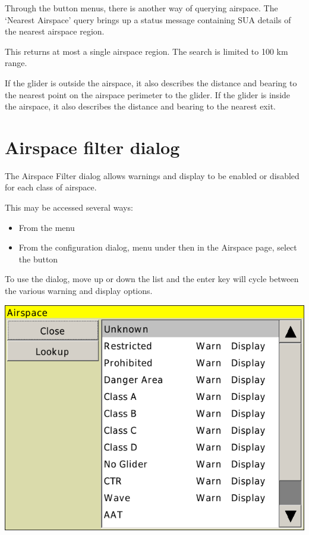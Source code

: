 \documentclass[a4paper,12pt]{refrep}
\begin{document}
Through the button menus, there is another way of querying airspace.
The `Nearest Airspace' query brings up a status message containing SUA
details of the nearest airspace region. 
\begin{quote}
\blink{}
\end{quote}
This returns at most a single airspace region.  The search is limited
to  100 km range.

If the glider is outside the airspace, it also describes the distance
and bearing to the nearest point on the airspace perimeter to the
glider.  If the glider is inside the airspace, it also describes the
distance and bearing to the nearest exit.

\section{Airspace filter dialog}\label{sec:airsp-filt-dial}

The Airspace Filter dialog allows warnings and display to be enabled
or disabled for each class of airspace.  

This may be accessed several ways:
\begin{itemize}
\item From the menu \blink{}\blink{}
\item From the configuration dialog, menu under
\blink{}\blink{} then in the
Airspace page, select the button 
\end{itemize}

To use the dialog, move up or down the list and the enter key will
cycle between the various warning and display options.

\begin{center}
\includegraphics[angle=0,width=\linewidth,keepaspectratio='true']{figures/airspacefilter.png}
\end{center}
\end{document}
